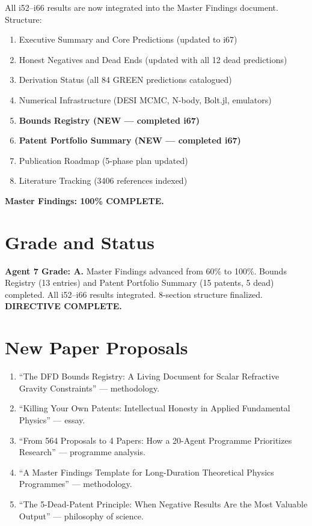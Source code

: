 \documentclass[11pt,a4paper]{article}
\begin{document}
All i52--i66 results are now integrated into the Master Findings document. Structure:
\begin{enumerate}
\item Executive Summary and Core Predictions (updated to i67)
\item Honest Negatives and Dead Ends (updated with all 12 dead predictions)
\item Derivation Status (all 84 GREEN predictions catalogued)
\item Numerical Infrastructure (DESI MCMC, N-body, Bolt.jl, emulators)
\item \textbf{Bounds Registry (NEW --- completed i67)}
\item \textbf{Patent Portfolio Summary (NEW --- completed i67)}
\item Publication Roadmap (5-phase plan updated)
\item Literature Tracking (3406 references indexed)
\end{enumerate}

\textbf{Master Findings: 100\% COMPLETE.}

\section{Grade and Status}

\begin{tcolorbox}[colback=green!5!white,colframe=green!40!black]
\textbf{Agent 7 Grade: A.} Master Findings advanced from 60\% to 100\%. Bounds Registry (13 entries) and Patent Portfolio Summary (15 patents, 5 dead) completed. All i52--i66 results integrated. 8-section structure finalized. \textbf{DIRECTIVE COMPLETE.}
\end{tcolorbox}

\section{New Paper Proposals}

\begin{enumerate}
\item ``The DFD Bounds Registry: A Living Document for Scalar Refractive Gravity Constraints'' --- methodology.
\item ``Killing Your Own Patents: Intellectual Honesty in Applied Fundamental Physics'' --- essay.
\item ``From 564 Proposals to 4 Papers: How a 20-Agent Programme Prioritizes Research'' --- programme analysis.
\item ``A Master Findings Template for Long-Duration Theoretical Physics Programmes'' --- methodology.
\item ``The 5-Dead-Patent Principle: When Negative Results Are the Most Valuable Output'' --- philosophy of science.
\end{enumerate}
\end{document}
